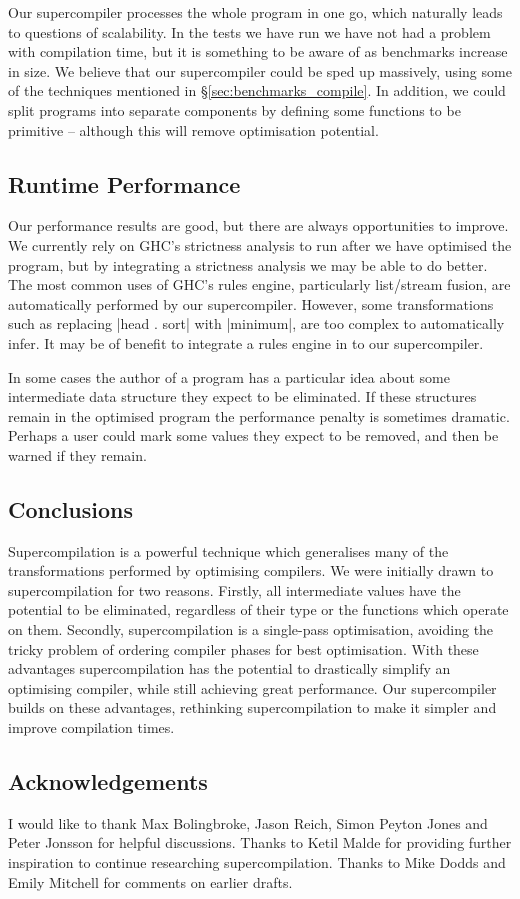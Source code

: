\documentclass[draft]{sigplanconf}
\begin{document}
Our supercompiler processes the whole program in one go, which naturally leads to questions of scalability. In the tests we have run we have not had a problem with compilation time, but it is something to be aware of as benchmarks increase in size. We believe that our supercompiler could be sped up massively, using some of the techniques mentioned in \S\ref{sec:benchmarks_compile}. In addition, we could split programs into separate components by defining some functions to be primitive -- although this will remove optimisation potential.

\subsection{Runtime Performance}

Our performance results are good, but there are always opportunities to improve. We currently rely on GHC's strictness analysis to run after we have optimised the program, but by integrating a strictness analysis we may be able to do better. The most common uses of GHC's rules engine, particularly list/stream fusion, are automatically performed by our supercompiler. However, some transformations such as replacing |head . sort| with |minimum|, are too complex to automatically infer. It may be of benefit to integrate a rules engine in to our supercompiler.

In some cases the author of a program has a particular idea about some intermediate data structure they expect to be eliminated. If these structures remain in the optimised program the performance penalty is sometimes dramatic. Perhaps a user could mark some values they expect to be removed, and then be warned if they remain.

\subsection{Conclusions}

Supercompilation is a powerful technique which generalises many of the transformations performed by optimising compilers. We were initially drawn to supercompilation for two reasons. Firstly, all intermediate values have the potential to be eliminated, regardless of their type or the functions which operate on them. Secondly, supercompilation is a single-pass optimisation, avoiding the tricky problem of ordering compiler phases for best optimisation. With these advantages supercompilation has the potential to drastically simplify an optimising compiler, while still achieving great performance. Our supercompiler builds on these advantages, rethinking supercompilation to make it simpler and improve compilation times.

\subsection*{Acknowledgements}

I would like to thank Max Bolingbroke, Jason Reich, Simon Peyton Jones and Peter Jonsson for helpful discussions. Thanks to Ketil Malde for providing further inspiration to continue researching supercompilation. Thanks to Mike Dodds and Emily Mitchell for comments on earlier drafts.


\balance

\end{document}
